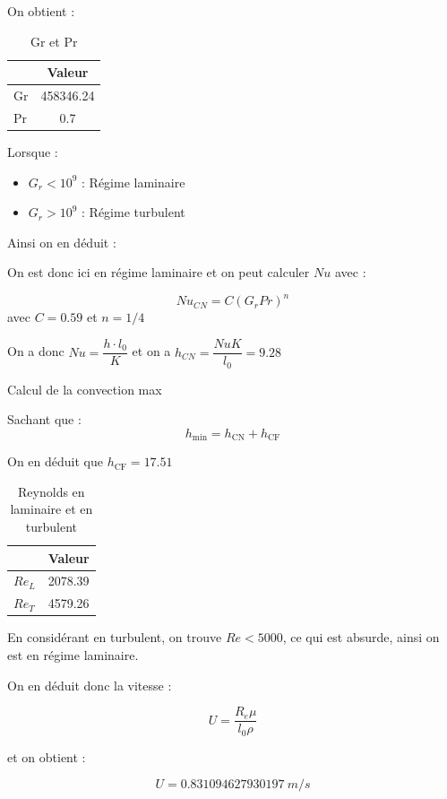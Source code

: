 \documentclass[11pt,a4paper]{article}
\begin{document}
On obtient : 

\begin{table}[H]
\centering
\begin{tabular}{|l|c|}
\hline
\rowcolor{blue!17}
 & Valeur \\
\hline
\rowcolor{pink!20}
Gr & 458346.24 \\
\hline
\rowcolor{pink!40}
Pr & 0.7 \\
\hline
\end{tabular}
\caption{Gr et Pr}
\end{table}

Lorsque : 

\begin{itemize}
    \item $G_r < 10^9$ : Régime laminaire
    \item $G_r > 10^9$ : Régime turbulent
\end{itemize}


Ainsi on en déduit : 


On est donc ici en régime laminaire et on peut calculer $Nu$ avec : 

$$Nu_{CN} = C (G_r Pr)^n$$ avec $C = 0.59$ et  $n=1/4$

On a donc $Nu = \dfrac{h \cdot l_0}{K}$ et on a $h_{CN} = \dfrac{Nu K}{l_0} = 9.28$

Calcul de la convection max 

Sachant que : $$h_\text{min} = h_\text{CN} + h_\text{CF}  $$

On en déduit que $h_\text{CF} = 17.51 $

\begin{table}[H]
\centering
\begin{tabular}{|l|c|}
\hline
\rowcolor{blue!17}
 & Valeur \\
\hline
\rowcolor{pink!20}
$Re_L$ & 2078.39 \\
\hline
\rowcolor{pink!40}
$Re_T$ & 4579.26 \\
\hline
\end{tabular}
\caption{Reynolds en laminaire et en turbulent}
\end{table}


En considérant en turbulent, on trouve $Re < 5000$, ce qui est absurde, ainsi on est en régime laminaire. 

On en déduit donc la vitesse : 

$$U = \dfrac{R_e\mu}{l_0 \rho}$$

et on obtient : 

$$U = \SI{0.831094627930197}{m/s}$$
\end{document}
